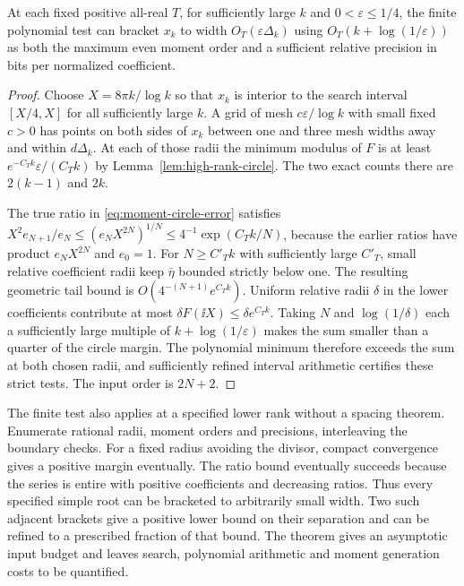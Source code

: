\begin{theorem}\label{thm:high-rank-direct}
At each fixed positive all-real \(T\), for sufficiently large \(k\) and
\(0<\varepsilon\le1/4\), the finite polynomial test can bracket
\(x_k\) to width \(O_T(\varepsilon\Delta_k)\) using
\(O_T(k+\log(1/\varepsilon))\) as both the maximum even moment order
and a sufficient relative precision in bits per normalized coefficient.
\end{theorem}
\begin{proof}
Choose \(X=8\pi k/\log k\) so that \(x_k\) is interior to the search
interval \([X/4,X]\) for all sufficiently large \(k\). A grid
of mesh \(c\varepsilon/\log k\) with small fixed \(c>0\) has points
on both sides of \(x_k\) between one and three mesh widths away
and within \(d\Delta_k\). At each of those radii the minimum
modulus of \(F\) is at least \(e^{-C_T k}\varepsilon/(C_T k)\)
by Lemma~\ref{lem:high-rank-circle}. The two exact counts there
are \(2(k-1)\) and \(2k\).

The true ratio in \eqref{eq:moment-circle-error} satisfies
\(X^2 e_{N+1}/e_N\le(e_N X^{2N})^{1/N}
\le 4^{-1}\exp(C_T k/N)\), because the earlier ratios have
product \(e_N X^{2N}\) and \(e_0=1\). For \(N\ge C'_T k\)
with sufficiently large \(C'_T\), small relative coefficient radii
keep \(\bar\eta\) bounded strictly below one. The resulting
geometric tail bound is \(O(4^{-(N+1)}e^{C_T k})\).
Uniform relative radii \(\delta\) in the lower coefficients
contribute at most \(\delta F(\ii X)\le\delta e^{C_T k}\).
Taking \(N\) and \(\log(1/\delta)\) each a sufficiently large
multiple of \(k+\log(1/\varepsilon)\) makes the sum smaller than a
quarter of the circle margin. The polynomial minimum therefore
exceeds the sum at both chosen radii, and sufficiently refined
interval arithmetic certifies these strict tests. The input order
is \(2N+2\).
\end{proof}

The finite test also applies at a specified lower rank without a
spacing theorem. Enumerate rational radii, moment orders and
precisions, interleaving the boundary checks. For a fixed radius
avoiding the divisor, compact convergence gives a positive margin
eventually. The ratio bound eventually succeeds because the series
is entire with positive coefficients and decreasing ratios.
Thus every specified simple root can be bracketed to arbitrarily
small width. Two such adjacent brackets give a positive lower
bound on their separation and can be refined to a prescribed
fraction of that bound. The theorem gives an asymptotic input budget
and leaves search, polynomial arithmetic and moment generation costs
to be quantified.

